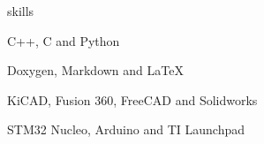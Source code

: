 \begin{section}{skills}

\begin{skills}

  \item {}
    {C++, C and Python}



  \item {}
    {Doxygen, Markdown and \LaTeX}

  \item {}
    {KiCAD, Fusion 360, FreeCAD and Solidworks}

  \item {}
    {STM32 Nucleo, Arduino and TI Launchpad}


\end{skills}

\end{section}
